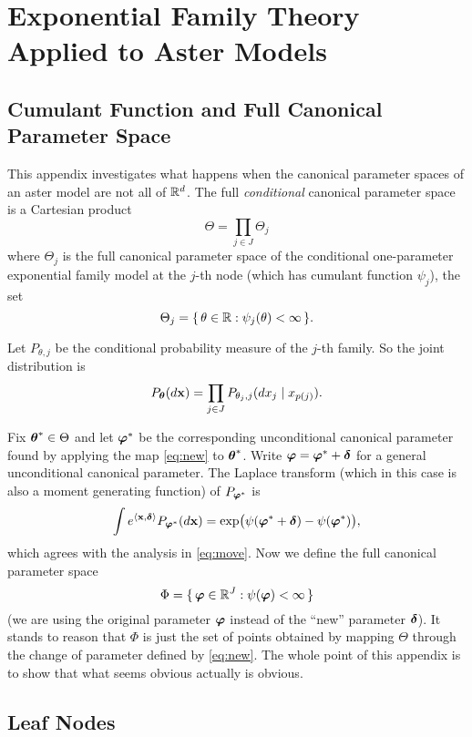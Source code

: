 \section{Exponential Family Theory Applied to Aster Models}

\subsection{Cumulant Function and Full Canonical Parameter Space}

This appendix investigates what happens when the canonical parameter spaces
of an aster model are not all of $\mathbb{R}^d$.  The full \emph{conditional}
canonical parameter space is a Cartesian product
$$
   \Theta = \prod_{j \in J} \Theta_j
$$
where $\Theta_j$ is the full canonical parameter space of the
conditional one-parameter exponential family model at the $j$-th node
(which has cumulant function $\psi_j$), the set
$$
   \Theta_j = \{\,  \theta \in \mathbb{R} : \psi_j(\theta) < \infty  \,\}.
$$

Let $P_{\theta, j}$ be the conditional probability measure of the $j$-th
family.  So the joint distribution is
$$
   P_{{\boldsymbol{\theta}}}(d \mathbf{x})
   =
   \prod_{j \in J} P_{\theta_j, j}(d x_j \mid x_{p(j)}).
$$

Fix ${\boldsymbol{\theta}}^* \in \Theta$ and let ${\boldsymbol{\varphi}}^*$ be the corresponding
unconditional canonical parameter found by applying the map \eqref{eq:new}
to ${\boldsymbol{\theta}}^*$.  Write ${\boldsymbol{\varphi}} = {\boldsymbol{\varphi}}^* + {\boldsymbol{\delta}}$ for
a general unconditional canonical parameter.  The Laplace transform
(which in this case is also a moment generating function)
of $P_{{\boldsymbol{\varphi}}^*}$ is
\begin{equation} \label{eq:this-is-it}
   \int e^{\langle \mathbf{x}, {\boldsymbol{\delta}} \rangle} P_{{\boldsymbol{\varphi}}^*}(d \mathbf{x})
   =
   \exp\bigl( \psi({\boldsymbol{\varphi}}^* + {\boldsymbol{\delta}}) - \psi({\boldsymbol{\varphi}}^*) \bigr),
\end{equation}
which agrees with the analysis in \eqref{eq:move}.  Now we define the
full canonical parameter space
$$
   \Phi = \{\,  {\boldsymbol{\varphi}} \in \mathbb{R}^J : \psi({\boldsymbol{\varphi}}) < \infty  \,\}
$$
(we are using the original parameter ${\boldsymbol{\varphi}}$ instead of the ``new''
parameter ${\boldsymbol{\delta}}$).  It stands to reason that $\Phi$ is just the
set of points obtained by mapping $\Theta$ through the change of parameter
defined by \eqref{eq:new}.  The whole point of this appendix is to show
that what seems obvious actually is obvious.

\subsection{Leaf Nodes}

